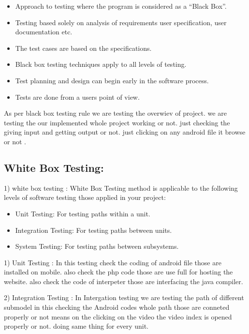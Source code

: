 \begin{itemize}
\item Approach to testing where the program is considered as a “Black Box”.
\item Testing based solely on analysis of requirements  user specification, user documentation etc.
\item The test cases are based on the specifications.
\item Black box testing techniques apply to all levels of testing.
\item Test planning and design can begin early in the software process.
\item Tests are done from a users point of view.
\end{itemize}

  As per black box testing rule we are testing the overwiev of project.
  we are testing the our implemented whole  project working or not. just checking the
  giving input and getting output or not. just clicking on any android file it browse or not . 

\subsection{White Box Testing: }
 1) white box testing :
 White Box Testing method is applicable to the following levels of software testing those applied in your project:
\begin{itemize}
     \item                  Unit Testing: For testing paths within a unit.
     \item                  Integration Testing: For testing paths between units.
      \item                 System Testing: For testing paths between subsystems.
\end{itemize}
           
                1) Unit Testing :
                             In this testing check the coding of android file those are installed on mobile.
                      also check the php code those are use full for hosting the website. also check the code 
                      of interpeter those are interfacing the java compiler.
                 
               2) Integration Testing :
                                  In Intergation testing we are testing the path of different submodel
                     in this checking the Android codes whole path those are conneted properly or not means 
                     on the clicking on the video the video index is opened properly or not. doing same thing for 
                      every unit. 

